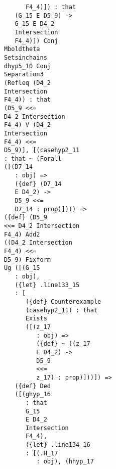 \documentclass[12pt]{article}
\begin{document}
\begin{verbatim}
                                     F4_4)]) : that 
                                  (G_15 E D5_9) -> 
                                  G_15 E D4_2 
                                  Intersection 
                                  F4_4)]) Conj 
                               Mboldtheta 
                               Setsinchains 
                               dhyp5_10 Conj 
                               Separation3 
                               (Refleq (D4_2 
                               Intersection 
                               F4_4)) : that 
                               (D5_9 <<= 
                               D4_2 Intersection 
                               F4_4) V (D4_2 
                               Intersection 
                               F4_4) <<= 
                               D5_9)], [(casehyp2_11 
                               : that ~ (Forall 
                               ([(D7_14 
                                  : obj) => 
                                  ({def} (D7_14 
                                  E D4_2) -> 
                                  D5_9 <<= 
                                  D7_14 : prop)]))) => 
                               ({def} (D5_9 
                               <<= D4_2 Intersection 
                               F4_4) Add2 
                               ((D4_2 Intersection 
                               F4_4) <<= 
                               D5_9) Fixform 
                               Ug ([(G_15 
                                  : obj), 
                                  ({let} .line133_15 
                                  : [
                                     ({def} Counterexample 
                                     (casehyp2_11) : that 
                                     Exists 
                                     ([(z_17 
                                        : obj) => 
                                        ({def} ~ ((z_17 
                                        E D4_2) -> 
                                        D5_9 
                                        <<= 
                                        z_17) : prop)]))]) => 
                                  ({def} Ded 
                                  ([(ghyp_16 
                                     : that 
                                     G_15 
                                     E D4_2 
                                     Intersection 
                                     F4_4), 
                                     ({let} .line134_16 
                                     : [(.H_17 
                                        : obj), (hhyp_17 

\end{verbatim}
\end{document}

